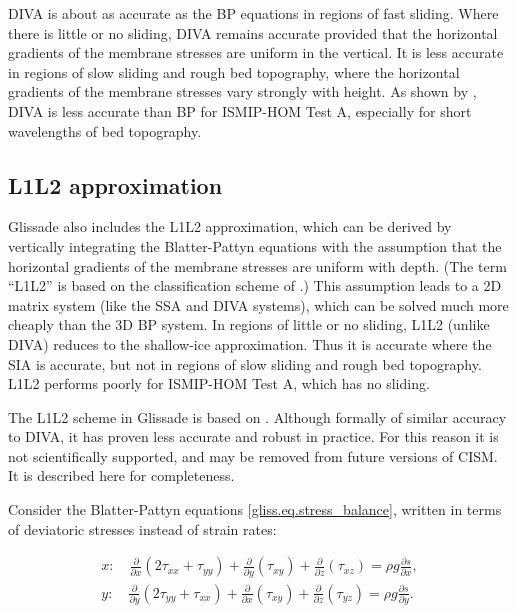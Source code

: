 {DIVA is about as accurate as the BP equations in regions of fast sliding.  
Where there is little or no sliding, DIVA remains accurate provided that
the horizontal gradients of the membrane stresses are uniform in the vertical.
It is less accurate in regions of slow sliding and rough bed topography, where
the horizontal gradients of the membrane stresses vary strongly with height.
As shown by \citet{Goldberg2011}, DIVA is less accurate than BP for ISMIP-HOM Test A,
especially for short wavelengths of bed topography.

\subsection{L1L2 approximation}

Glissade also includes the L1L2 approximation, which can be derived by vertically integrating
the Blatter-Pattyn equations with the assumption that the horizontal gradients of the membrane
stresses are uniform with depth.
(The term ``L1L2'' is based on the classification scheme of \citet{Hindmarsh2004}.)  
This assumption leads to a 2D matrix system (like the SSA and DIVA systems), which can be solved
much more cheaply than the 3D BP system.
In regions of little or no sliding, L1L2 (unlike DIVA) reduces to the
shallow-ice approximation.  Thus it is accurate where the SIA is accurate,
but not in regions of slow sliding and rough bed topography.
L1L2 performs poorly for ISMIP-HOM Test A, which has no sliding.

The L1L2 scheme in Glissade is based on \citet{Perego2012}.
Although formally of similar accuracy to DIVA, it has proven less accurate and robust
in practice.  For this reason it is not scientifically supported, and may be removed
from future versions of CISM.  It is described here for completeness.

Consider the Blatter-Pattyn equations \eqref{gliss.eq.stress_balance}, written in
terms of deviatoric stresses instead of strain rates:

\begin{equation}
  \label{gliss.eq.stress_balance_tau}
  \begin{split}
    x: \quad \frac{\partial }{\partial x}\left( 2 \tau_{xx} + \tau_{yy} \right)
           + \frac{\partial }{\partial y}\left( \tau_{xy} \right)
           + \frac{\partial }{\partial z}\left( \tau_{xz} \right)
           = \rho g\frac{\partial s}{\partial x}, \\
    y: \quad \frac{\partial }{\partial y}\left( 2 \tau_{yy} + \tau_{xx} \right)
           + \frac{\partial }{\partial x}\left( \tau_{xy} \right)
           + \frac{\partial }{\partial z}\left( \tau_{yz} \right)
           = \rho g\frac{\partial s}{\partial y}.
  \end{split}
\end{equation}

}
